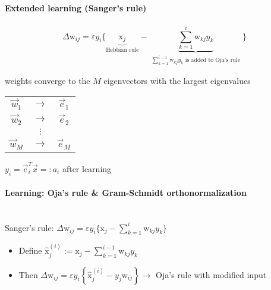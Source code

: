 \paragraph{Extended learning (Sanger's rule)}
\begin{equation*}
			\Delta \mathrm{w}_{ij} = \varepsilon y_i \bigg\{ \underbrace{\mathrm{x}_j}_{\text{Hebbian rule}} - \underbrace{\sum_{k=1}^{i} \mathrm{w}_{kj} y_k}_{\substack{\sum_{k=1}^{i-1} \mathrm{w}_{kj} y_k  \text{ is added to Oja's rule}}} \bigg\}
		\end{equation*}

\begin{itemize}
		\itl weights converge to the $M$ eigenvectors with the largest eigenvalues \\ \vspace{0.2cm}
\begin{tabular}{ccc}
			$\vec{w}_1$ & $\rightarrow$ & $\vec{e}_1$ \\ 
			$\vec{w}_2$ & $\rightarrow$ & $\vec{e}_2$ \\ 
						& $\vdots$ &  \\ 
			$\vec{w}_M$ & $\rightarrow$ & $\vec{e}_M$  
\end{tabular}
		\vspace{0.2cm}
		\itl $y_i = \vec{e}_i^T \vec{x} =: a_i$ after learning
\end{itemize}

\paragraph{Learning: Oja's rule \& Gram-Schmidt orthonormalization}\mbox{}\\
	Sanger's rule: $\Delta \mathrm{w}_{ij} = \varepsilon y_i \bigg\{ \mathrm{x}_j - \sum_{k=1}^{i} \mathrm{w}_{kj} y_k \bigg\}$
	\begin{itemize}
		\item Define $\hat{\mathrm{x}}_j^{(i)} := \mathrm{x}_j - \sum_{k=1}^{i-1} \mathrm{w}_{kj} y_k$
		\item Then $\Delta \mathrm{w}_{ij} = \varepsilon y_i \left\{ \hat{\mathrm{x}}_j^{(i)} - y_j \mathrm{w}_{ij} \right\} 		  					\longrightarrow$ Oja's rule with modified input
	\end{itemize}
	
